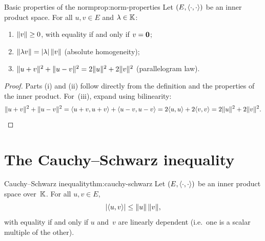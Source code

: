 \begin{proposition}{Basic properties of the norm}{prop:norm-properties}
Let $(E,\langle\cdot,\cdot\rangle)$ be an inner product space.  For all
$u,v\in E$ and $\lambda\in{\mathbb{K}}$:
\begin{enumerate}[label=(\roman*)]
  \item $\lVert v\rVert\geq 0$, with equality if and only if $v = \mathbf{0}$;
  \item $\lVert\lambda v\rVert = \lvert\lambda\rvert\,\lVert v\rVert$ \quad
    (absolute homogeneity);
  \item $\lVert u+v\rVert^2 + \lVert u-v\rVert^2 = 2\lVert u\rVert^2 + 2\lVert v\rVert^2$
    \quad (parallelogram law).
\end{enumerate}
\end{proposition}

\begin{proof}
Parts (i) and (ii) follow directly from the definition and the
properties of the inner product.  For~(iii), expand using bilinearity:
\[
  \lVert u+v\rVert^2 + \lVert u-v\rVert^2
    = \langle u+v,u+v\rangle + \langle u-v,u-v\rangle
    = 2\langle u,u\rangle + 2\langle v,v\rangle
    = 2\lVert u\rVert^2 + 2\lVert v\rVert^2. \qedhere
\]
\end{proof}


\section{The Cauchy--Schwarz inequality}\label{sec:cauchy-schwarz}

\begin{theorem}{Cauchy--Schwarz inequality}{thm:cauchy-schwarz}
Let $(E,\langle\cdot,\cdot\rangle)$ be an inner product space over~${\mathbb{K}}$.
For all $u,v\in E$,
\[
  \lvert\langle u,v\rangle\rvert \leq \lVert u\rVert\,\lVert v\rVert,
\]
with equality if and only if $u$ and~$v$ are linearly dependent
(i.e.\ one is a scalar multiple of the other).
\end{theorem}

